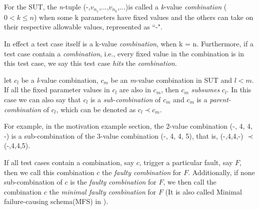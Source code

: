 \documentclass{sig-alternate}
\begin{document}

\begin{definition}
For the SUT, the \emph{n}-tuple (-,$v_{n_{1}}$,...,$v_{n_{k}}$,...)is called a \emph{k}-value \emph{combination} ($0 < k \leq n $) when some k parameters have fixed values and the others can take on their respective allowable values, represented as ``-".

In effect a test case itself is a k-value \emph{combination}, when k = n. Furthermore, if a test case contain a \emph{combination}, i.e., every fixed value in the combination is in this test case, we say this test case \emph{hits} the \emph{combination}.
\end{definition}

\begin{definition}
let $c_{l}$ be a \emph{l}-value combination, $c_{m}$ be an \emph{m}-value combination in SUT and $l < m$. If all the fixed parameter values in $c_{l}$ are also in $c_{m}$, then $c_{m}$ \emph{subsumes} $c_{l}$. In this case we can also say that $c_{l}$ is a \emph{sub-combination} of $c_{m}$ and $c_{m}$ is a \emph{parent-combination} of $c_{l}$, which can be denoted as $c_{l} \prec  c_{m}$.
\end{definition}

For example, in the motivation example section, the 2-value combination (-, 4, 4, -) is a sub-combination of the 3-value combination (-, 4, 4, 5), that is, (-,4,4,-) $\prec$ (-,4,4,5).

\begin{definition}
If all test cases contain a combination, say $c$, trigger a particular fault, say $F$, then we call this combination $c$ the \emph{faulty combination} for $F$. Additionally, if none sub-combination of $c$ is the \emph{faulty combination} for $F$, we then call the combination $c$ the \emph{minimal faulty combination} for $F$ (It is also called Minimal failure-causing schema(MFS) in ).

\end{definition}
\end{document}
